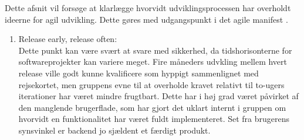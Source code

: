 \documentclass[]{article}
\begin{document}
Dette afsnit vil forsøge at klarlægge hvorvidt udviklingsprocessen har overholdt ideerne for agil udvikling. Dette gøres med udgangspunkt i det agile manifest \cite{martin2006agile}.
\begin{enumerate}
    \item Release early, release often: \\
Dette punkt kan være svært at svare med sikkerhed, da tidshorisonterne for softwareprojekter kan variere meget. Fire måneders udvkling mellem hvert release ville godt kunne kvalificere som hyppigt sammenlignet med rejsekortet, men gruppens evne til at overholde kravet relativt til to-ugers iterationer har været mindre frugtbart. Dette har i høj grad været påvirket af den manglende brugerflade, som har gjort det uklart internt i gruppen om hvorvidt en funktionalitet har været fuldt implementeret. Set fra brugerens synsvinkel er backend jo sjældent et færdigt produkt.


\end{enumerate}
\end{document}
